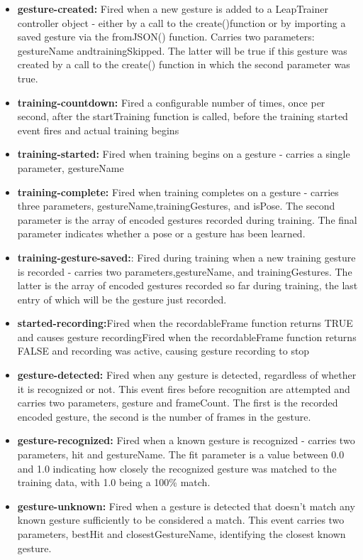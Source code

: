 \documentclass[11pt,a4paper]{article}
\begin{document}
\begin{itemize}
    \item \textbf{gesture-created:} Fired when a new gesture is added to a LeapTrainer controller object - either by a call to the create()function or by importing a saved gesture via the fromJSON() function. Carries two parameters: gestureName andtrainingSkipped. The latter will be true if this gesture was created by a call to the create() function in which the second parameter was true.
    \item \textbf{training-countdown:} Fired a configurable number of times, once per second, after the startTraining function is called, before the training started event fires and actual training begins
    \item \textbf{training-started:} Fired when training begins on a gesture - carries a single parameter, gestureName
    \item \textbf{training-complete:} Fired when training completes on a gesture - carries three parameters, gestureName,trainingGestures, and isPose. The second parameter is the array of encoded gestures recorded during training. The final parameter indicates whether a pose or a gesture has been learned.
    \item \textbf{training-gesture-saved:}: Fired during training when a new training gesture is recorded - carries two parameters,gestureName, and trainingGestures. The latter is the array of encoded gestures recorded so far during training, the last entry of which will be the gesture just recorded.
    \item \textbf{started-recording:}Fired when the recordableFrame function returns TRUE and causes gesture recordingFired when the recordableFrame function returns FALSE and recording was active, causing gesture recording to stop
    \item \textbf{gesture-detected:} Fired when any gesture is detected, regardless of whether it is recognized or not. This event fires before recognition are attempted and carries two parameters, gesture and frameCount. The first is the recorded encoded gesture, the second is the number of frames in the gesture.
    \item \textbf{gesture-recognized:} Fired when a known gesture is recognized - carries two parameters, hit and gestureName. The fit parameter is a value between 0.0 and 1.0 indicating how closely the recognized gesture was matched to the training data, with 1.0 being a 100\% match.
    \item \textbf{gesture-unknown:} Fired when a gesture is detected that doesn't match any known gesture sufficiently to be considered a match. This event carries two parameters, bestHit and closestGestureName, identifying the closest known gesture.
\end{itemize}
\end{document}
